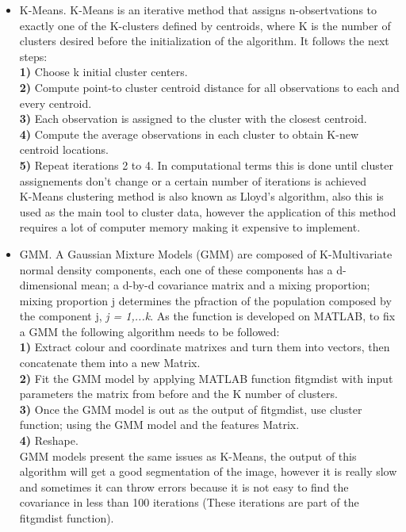 \documentclass[10pt,twocolumn,letterpaper]{article}
\begin{document}
\begin{itemize}
    \item K-Means. 
     K-Means is an iterative method that assigns n-obsertvations to exactly one of the K-clusters defined by centroids, where K is the number of clusters desired before the initialization of the algorithm.
     It follows the next steps:\\
     \textbf{1)} Choose k initial cluster centers. \\
     \textbf{2)} Compute point-to cluster centroid distance for all observations to each and every centroid.\\
     \textbf{3)} Each observation is assigned to the cluster with the closest centroid.\\
     \textbf{4)} Compute the average observations in each cluster to obtain K-new centroid locations.\\
     \textbf{5)} Repeat iterations 2 to 4. In computational terms this is done until cluster assignements don't change or a certain number of iterations is achieved\\
     K-Means clustering method is also known as Lloyd's algorithm, also this is used as the main tool to cluster data, however the application of this method requires a lot of computer memory making it expensive to implement.\cite{lloyd_1982}\\
     \item GMM.
     A Gaussian Mixture Models (GMM) are composed of K-Multivariate normal density components, each one of these components has a d-dimensional mean; a d-by-d covariance matrix and a mixing proportion; mixing proportion j determines the pfraction of the population composed by the component j, \textit{j = 1,...k}.
     As the function is developed on MATLAB, to fix a GMM the following algorithm needs to be followed:\\
     \textbf{1)} Extract colour and coordinate matrixes and turn them into vectors, then concatenate them into a new Matrix.\\
     \textbf{2)} Fit the GMM model by applying MATLAB function fitgmdist with input parameters  the matrix from before and the K number of clusters.\\
     \textbf{3)} Once the GMM model is out as the output of fitgmdist, use cluster function; using the GMM model and the features Matrix.\\
     \textbf{4)} Reshape.\\
     GMM models present the same issues as K-Means, the output of this algorithm will get a good segmentation of the image, however it is really slow and sometimes it can throw errors because it is not easy to find the covariance in less than 100 iterations (These iterations are part of the fitgmdist function).\cite{mclachlan_peel_2000}
     

\end{itemize}
\end{document}
